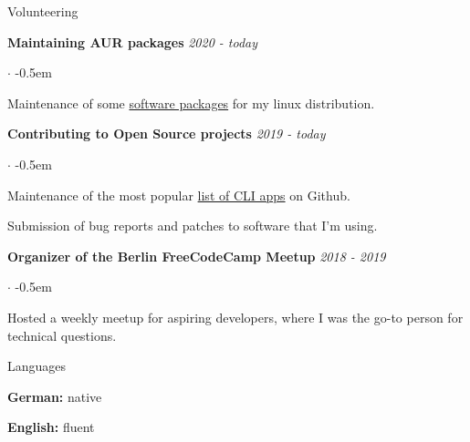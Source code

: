 \documentclass{cv}
\begin{document}
\begin{rSection}{Volunteering}

  \hfil  {\bf Maintaining AUR packages}
  \hfill
  {\em 2020 - today}

  \begin{list}{$\cdot$}{}
  \itemsep -0.5em \vspace{-0.5em}
    \smallskip
  \item Maintenance of some \href{https://aur.archlinux.org/packages/?SeB=m&K=jneidel}{software packages} for my linux distribution.
  \end{list}

  {\bf Contributing to Open Source projects}
  \hfill
  {\em 2019 - today}

  \begin{list}{$\cdot$}{}
  \itemsep -0.5em \vspace{-0.5em}
    \smallskip
  \item Maintenance of the most popular \href{https://github.com/agarrharr/awesome-cli-apps}{list of CLI apps} on Github.
  \item Submission of bug reports and patches to software that I'm using.
  \end{list}

  {\bf Organizer of the Berlin FreeCodeCamp Meetup}
  \hfill
  {\em 2018 - 2019}

  \begin{list}{$\cdot$}{}
  \itemsep -0.5em \vspace{-0.5em}
    \smallskip
  \item Hosted a weekly meetup for aspiring developers, where I was the go-to person for technical questions.
  \end{list}

\end{rSection}

\begin{rSection}{Languages}
  \begin{minipage}[l]{0.48\linewidth}
    {\bf German:} native
  \end{minipage}
  \begin{minipage}[l]{0.48\linewidth}
    {\bf English:} fluent \hfill
  \end{minipage}
\end{rSection}
\end{document}
